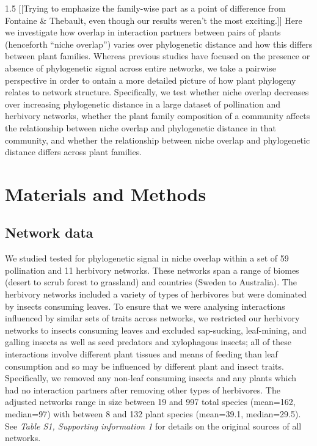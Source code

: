 \documentclass[12pt]{article}
\begin{document}
\begin{spacing}{1.5}
  [[Trying to emphasize the family-wise part as a point of difference from Fontaine \& Thebault, even though our results weren't the most exciting.]]
  Here we investigate how overlap in interaction partners between 
  pairs of plants (henceforth ``niche overlap'') varies over 
  phylogenetic distance and how this differs between plant families. 
  Whereas previous 
  studies have focused on the presence or absence of phylogenetic
  signal across entire networks, we take a pairwise perspective in
  order to ontain a more detailed picture of how plant phylogeny
  relates to network structure. Specifically,
  we test whether niche overlap decreases over increasing phylogenetic
  distance in a large dataset of pollination and herbivory networks, 
  whether the plant family composition of a community affects the
  relationship between niche overlap and phylogenetic distance in that 
  community, and whether the relationship between niche overlap and 
  phylogenetic distance differs across plant families.


\section*{Materials and Methods}

\subsection*{Network data}

  We studied tested for phylogenetic signal in niche overlap within a 
  set of 59 pollination and 11 herbivory networks. These networks span 
  a range of biomes (desert to scrub forest to grassland) and 
  countries (Sweden to Australia). The herbivory networks included a 
  variety of types of herbivores but were dominated by insects 
  consuming leaves. To ensure that we were analysing interactions 
  influenced by similar sets of traits across networks, we restricted 
  our herbivory networks to insects consuming leaves and excluded 
  sap-sucking, leaf-mining, and galling insects as well as seed 
  predators and xylophagous insects; all of these interactions involve 
  different plant tissues and means of feeding than leaf consumption 
  and so may be influenced by different plant and insect traits. 
  Specifically, we removed any non-leaf consuming insects and any 
  plants which had no interaction partners after removing other types  
  of herbivores. The adjusted networks range in size between 19 and 
  997 total species (mean=162, median=97) with between 8 and 132 
  plant species (mean=39.1, median=29.5). See \emph{Table S1, 
  Supporting information 1} for details on the original sources of all 
  networks. 



\end{spacing}
\end{document}
